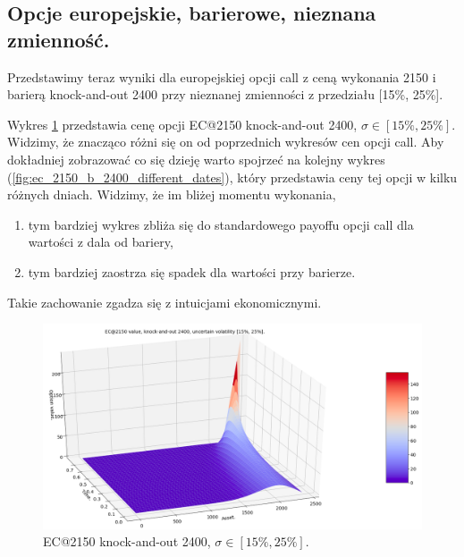 \documentclass[12pt]{article}
\begin{document}
\subsection{Opcje europejskie, barierowe, nieznana zmienność.}
Przedstawimy teraz wyniki dla europejskiej opcji call z ceną wykonania 2150 i barierą knock-and-out 2400 przy nieznanej zmienności z przedziału [15\%, 25\%]. 

Wykres  \ref{fig:ec_2150_b_2400_uv} przedstawia cenę opcji EC@2150 knock-and-out 2400, $\sigma \in [15\%, 25\%].$ Widzimy, że znacząco różni się on od poprzednich wykresów cen opcji call. Aby dokładniej zobrazować co się dzieję warto spojrzeć na kolejny wykres (\ref{fig:ec_2150_b_2400_different_dates}), który przedstawia ceny tej opcji w kilku różnych dniach. Widzimy, że im bliżej momentu wykonania, 
\begin{enumerate}
    \item tym bardziej wykres zbliża się do standardowego payoffu opcji call dla wartości z dala od bariery,
    \item tym bardziej zaostrza się spadek dla wartości przy barierze.
\end{enumerate} 
Takie zachowanie zgadza się z intuicjami ekonomicznymi. 

\begin{figure}[H]
    \centering
    \includegraphics[width=\textwidth,height=\textheight,keepaspectratio]{ec_2150_b_2400_uv.png}
    \caption{EC@2150 knock-and-out 2400, $\sigma \in [15\%, 25\%].$}
    \label{fig:ec_2150_b_2400_uv}
\end{figure}
\end{document}
